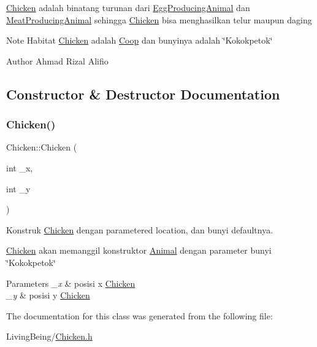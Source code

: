 \mbox{\hyperlink{classChicken}{Chicken}} adalah binatang turunan dari \mbox{\hyperlink{classEggProducingAnimal}{Egg\+Producing\+Animal}} dan \mbox{\hyperlink{classMeatProducingAnimal}{Meat\+Producing\+Animal}} sehingga \mbox{\hyperlink{classChicken}{Chicken}} bisa menghasilkan telur maupun daging

\begin{DoxyNote}{Note}
Habitat \mbox{\hyperlink{classChicken}{Chicken}} adalah \mbox{\hyperlink{classCoop}{Coop}} dan bunyinya adalah \char`\"{}\+Kokokpetok\char`\"{}
\end{DoxyNote}
\begin{DoxyAuthor}{Author}
Ahmad Rizal Alifio 
\end{DoxyAuthor}


\subsection{Constructor \& Destructor Documentation}
\mbox{\label{classChicken_a4ca0ca08ac03410d9551564b7bf77c8d}} 
\subsubsection{\texorpdfstring{Chicken()}{Chicken()}}
{\footnotesize\ttfamily Chicken\+::\+Chicken (\begin{DoxyParamCaption}\item[{int}]{\+\_\+x,  }\item[{int}]{\+\_\+y }\end{DoxyParamCaption})}



Konstruk \mbox{\hyperlink{classChicken}{Chicken}} dengan parametered location, dan bunyi defaultnya. 

\mbox{\hyperlink{classChicken}{Chicken}} akan memanggil konstruktor \mbox{\hyperlink{classAnimal}{Animal}} dengan parameter bunyi \char`\"{}\+Kokokpetok\char`\"{}


\begin{DoxyParams}{Parameters}
{\em \+\_\+x} & posisi x \mbox{\hyperlink{classChicken}{Chicken}} \\
\hline
{\em \+\_\+y} & posisi y \mbox{\hyperlink{classChicken}{Chicken}} \\
\hline
\end{DoxyParams}


The documentation for this class was generated from the following file\+:\begin{DoxyCompactItemize}
\item 
Living\+Being/\mbox{\hyperlink{Chicken_8h}{Chicken.\+h}}\end{DoxyCompactItemize}
